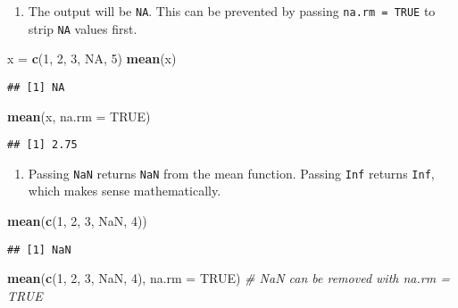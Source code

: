 \documentclass[
]{article}
\newenvironment{Shaded}{\begin{snugshade}}{\end{snugshade}}
\newcommand{\CommentTok}[1]{\textcolor[rgb]{0.56,0.35,0.01}{\textit{#1}}}
\newcommand{\DataTypeTok}[1]{\textcolor[rgb]{0.13,0.29,0.53}{#1}}
\newcommand{\DecValTok}[1]{\textcolor[rgb]{0.00,0.00,0.81}{#1}}
\newcommand{\KeywordTok}[1]{\textcolor[rgb]{0.13,0.29,0.53}{\textbf{#1}}}
\newcommand{\NormalTok}[1]{#1}
\newcommand{\OtherTok}[1]{\textcolor[rgb]{0.56,0.35,0.01}{#1}}
\newcommand{\StringTok}[1]{\textcolor[rgb]{0.31,0.60,0.02}{#1}}
\providecommand{\tightlist}{%
  \setlength{\itemsep}{0pt}\setlength{\parskip}{0pt}}
\begin{document}
\begin{enumerate}
\def\labelenumi{\arabic{enumi}.}
\tightlist
\item
  The output will be \texttt{NA}. This can be prevented by passing
  \texttt{na.rm\ =\ TRUE} to strip \texttt{NA} values first.
\end{enumerate}

\begin{Shaded}
\begin{Highlighting}[]
\NormalTok{x =}\StringTok{ }\KeywordTok{c}\NormalTok{(}\DecValTok{1}\NormalTok{, }\DecValTok{2}\NormalTok{, }\DecValTok{3}\NormalTok{, }\OtherTok{NA}\NormalTok{, }\DecValTok{5}\NormalTok{)}
\KeywordTok{mean}\NormalTok{(x)}
\end{Highlighting}
\end{Shaded}

\begin{verbatim}
## [1] NA
\end{verbatim}

\begin{Shaded}
\begin{Highlighting}[]
\KeywordTok{mean}\NormalTok{(x, }\DataTypeTok{na.rm =} \OtherTok{TRUE}\NormalTok{)}
\end{Highlighting}
\end{Shaded}

\begin{verbatim}
## [1] 2.75
\end{verbatim}

\begin{enumerate}
\def\labelenumi{\arabic{enumi}.}
\setcounter{enumi}{1}
\tightlist
\item
  Passing \texttt{NaN} returns \texttt{NaN} from the mean function.
  Passing \texttt{Inf} returns \texttt{Inf}, which makes sense
  mathematically.
\end{enumerate}

\begin{Shaded}
\begin{Highlighting}[]
\KeywordTok{mean}\NormalTok{(}\KeywordTok{c}\NormalTok{(}\DecValTok{1}\NormalTok{, }\DecValTok{2}\NormalTok{, }\DecValTok{3}\NormalTok{, }\OtherTok{NaN}\NormalTok{, }\DecValTok{4}\NormalTok{))}
\end{Highlighting}
\end{Shaded}

\begin{verbatim}
## [1] NaN
\end{verbatim}

\begin{Shaded}
\begin{Highlighting}[]
\KeywordTok{mean}\NormalTok{(}\KeywordTok{c}\NormalTok{(}\DecValTok{1}\NormalTok{, }\DecValTok{2}\NormalTok{, }\DecValTok{3}\NormalTok{, }\OtherTok{NaN}\NormalTok{, }\DecValTok{4}\NormalTok{), }\DataTypeTok{na.rm =} \OtherTok{TRUE}\NormalTok{) }\CommentTok{\# NaN can be removed with na.rm = TRUE}
\end{Highlighting}
\end{Shaded}
\end{document}
